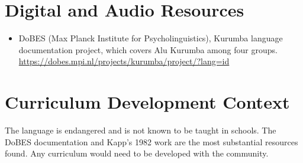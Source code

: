 \documentclass[12pt]{article}
\begin{document}
\section{Digital and Audio Resources}
\begin{itemize}
\item DoBES (Max Planck Institute for Psycholinguistics), Kurumba language documentation project, which covers Alu Kurumba among four groups. \url{https://dobes.mpi.nl/projects/kurumba/project/?lang=id}
\end{itemize}

\section{Curriculum Development Context}
The language is endangered and is not known to be taught in schools. The DoBES documentation and Kapp's 1982 work are the most substantial resources found. Any curriculum would need to be developed with the community.
\end{document}
